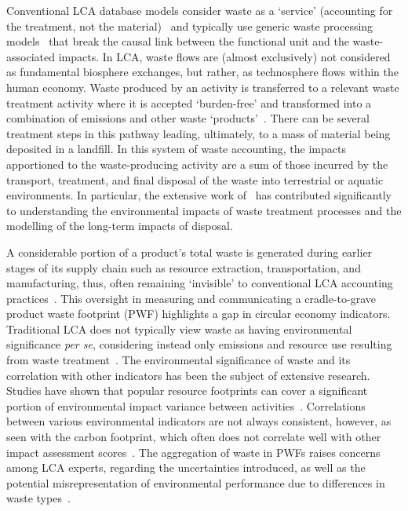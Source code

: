 \documentclass[a4paper,fleqn]{cas-dc}
\begin{document}
Conventional LCA database models consider waste as a `service' (accounting for the treatment, not the material)~\citep{guinee2021wasteisnotaservice} and typically use generic waste processing models~\citep{beylot2018} that break the causal link between the functional unit and the waste-associated impacts. In LCA, waste flows are (almost exclusively) not considered as fundamental biosphere exchanges, but rather, as technosphere flows within the human economy. Waste produced by an activity is transferred to a relevant waste treatment activity where it is accepted `burden-free' and transformed into a combination of emissions and other waste `products'~\citep{guinee2021wasteisnotaservice}. There can be several treatment steps in this pathway leading, ultimately, to a mass of material being deposited in a landfill. In this system of waste accounting, the impacts apportioned to the waste-producing activity are a sum of those incurred by the transport, treatment, and final disposal of the waste into terrestrial or aquatic environments. In particular, the extensive work of~\cite{doka2024publications} has contributed significantly to understanding the environmental impacts of waste treatment processes and the modelling of the long-term impacts of disposal.

A considerable portion of a product's total waste is generated during earlier stages of its supply chain such as resource extraction, transportation, and manufacturing, thus, often remaining `invisible' to conventional LCA accounting practices~\citep{laurenti2016wastefootprint}. This oversight in measuring and communicating a cradle-to-grave product waste footprint (PWF) highlights a gap in circular economy indicators. Traditional LCA does not typically view waste as having environmental significance \textit{per se}, considering instead only emissions and resource use resulting from waste treatment~\citep{bisinella2024wastelca, laurenti2023wastefootprint}. The environmental significance of waste and its correlation with other indicators has been the subject of extensive research. Studies have shown that popular resource footprints can cover a significant portion of environmental impact variance between activities~\citep{steinmann2017resourcefootprints,laurenti2023wastefootprint}. Correlations between various environmental indicators are not always consistent, however, as seen with the carbon footprint, which often does not correlate well with other impact assessment scores~\citep{laurenti2012carbonfootprint}. The aggregation of waste in PWFs raises concerns among LCA experts, regarding the uncertainties introduced, as well as the potential misrepresentation of environmental performance due to differences in waste types~\citep{chen2021methoduncertainty,huijbregts2010energyfootprint}.
\end{document}
